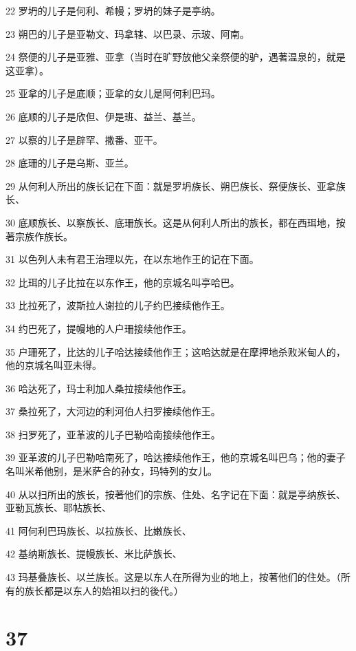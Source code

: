 \par 22 罗坍的儿子是何利、希幔；罗坍的妹子是亭纳。
\par 23 朔巴的儿子是亚勒文、玛拿辖、以巴录、示玻、阿南。
\par 24 祭便的儿子是亚雅、亚拿（当时在旷野放他父亲祭便的驴，遇著温泉的，就是这亚拿）。
\par 25 亚拿的儿子是底顺；亚拿的女儿是阿何利巴玛。
\par 26 底顺的儿子是欣但、伊是班、益兰、基兰。
\par 27 以察的儿子是辟罕、撒番、亚干。
\par 28 底珊的儿子是乌斯、亚兰。
\par 29 从何利人所出的族长记在下面：就是罗坍族长、朔巴族长、祭便族长、亚拿族长、
\par 30 底顺族长、以察族长、底珊族长。这是从何利人所出的族长，都在西珥地，按著宗族作族长。
\par 31 以色列人未有君王治理以先，在以东地作王的记在下面。
\par 32 比珥的儿子比拉在以东作王，他的京城名叫亭哈巴。
\par 33 比拉死了，波斯拉人谢拉的儿子约巴接续他作王。
\par 34 约巴死了，提幔地的人户珊接续他作王。
\par 35 户珊死了，比达的儿子哈达接续他作王；这哈达就是在摩押地杀败米甸人的，他的京城名叫亚未得。
\par 36 哈达死了，玛士利加人桑拉接续他作王。
\par 37 桑拉死了，大河边的利河伯人扫罗接续他作王。
\par 38 扫罗死了，亚革波的儿子巴勒哈南接续他作王。
\par 39 亚革波的儿子巴勒哈南死了，哈达接续他作王，他的京城名叫巴乌；他的妻子名叫米希他别，是米萨合的孙女，玛特列的女儿。
\par 40 从以扫所出的族长，按著他们的宗族、住处、名字记在下面：就是亭纳族长、亚勒瓦族长、耶帖族长、
\par 41 阿何利巴玛族长、以拉族长、比嫩族长、
\par 42 基纳斯族长、提幔族长、米比萨族长、
\par 43 玛基叠族长、以兰族长。这是以东人在所得为业的地上，按著他们的住处。（所有的族长都是以东人的始祖以扫的後代。）

\chapter{37}

